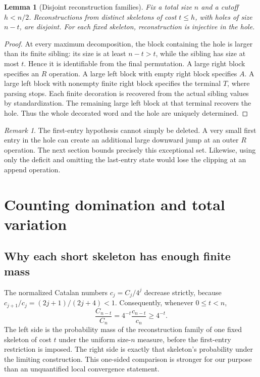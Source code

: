 \documentclass[11pt,a4paper]{article}
\newtheorem{lemma}[lemma]{Lemma}
\theoremstyle{definition}\newaliascnt{definition}{theorem}
\theoremstyle{remark}\newaliascnt{remark}{theorem}
\newtheorem{remark}[remark]{Remark}
\begin{document}
\begin{lemma}[Disjoint reconstruction families]\label{lj:lem:injective}
Fix a total size $n$ and a cutoff $h<n/2$. Reconstructions from distinct
skeletons of cost $t\le h$, with holes of size $n-t$, are disjoint.
For each fixed skeleton, reconstruction is injective in the hole.
\end{lemma}
\begin{proof}
At every maximum decomposition, the block containing the hole is larger
than its finite sibling: its size is at least $n-t>t$, while the sibling
has size at most $t$. Hence it is identifiable from the final
permutation. A large right block specifies an $R$ operation. A large
left block with empty right block specifies $A$. A large left block
with nonempty finite right block specifies the terminal $T$, where
parsing stops. Each finite decoration is recovered from the actual
sibling values by standardization. The remaining large left block at
that terminal recovers the hole. Thus the whole decorated word and the
hole are uniquely determined.
\end{proof}

\begin{remark}
The first-entry hypothesis cannot simply be deleted. A very small first
entry in the hole can create an additional large downward jump at an
outer $R$ operation. The next section bounds precisely this exceptional
set. Likewise, using only the deficit and omitting the last-entry state
would lose the clipping at an append operation.
\end{remark}

\section{Counting domination and total variation}
\label{lj:sec:tv}

\subsection{Why each short skeleton has enough finite mass}
The normalized Catalan numbers $c_j=C_j/4^j$ decrease strictly, because
$c_{j+1}/c_j=(2j+1)/(2j+4)<1$. Consequently, whenever $0\le t<n$,
\begin{equation}
 \frac{C_{n-t}}{C_n}
 =4^{-t}\frac{c_{n-t}}{c_n}\ge4^{-t}.
 \label{lj:eq:domination}
\end{equation}
The left side is the probability mass of the reconstruction family of
one fixed skeleton of cost $t$ under the uniform size-$n$ measure,
before the first-entry restriction is imposed. The right side is
exactly that skeleton's probability under the limiting construction.
This one-sided comparison is stronger for our purpose than an
unquantified local convergence statement.
\end{document}
